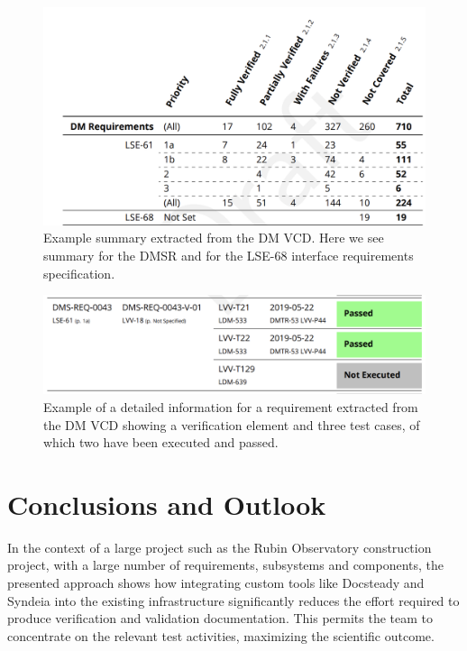 \begin{figure}
\begin{center}
\includegraphics[width=\textwidth]{imgs/VCDsumm.png}
 \caption{Example summary extracted from the DM VCD. 
 Here we see summary for the DMSR \cite{LSE-61} and for the LSE-68 interface requirements specification\cite{LSE-68}.}
 \label{fig:vcdsum}
\end{center}
\end{figure}

\begin{figure}
\begin{center}
\includegraphics[width=\textwidth]{imgs/VCDdetail.png}
 \caption{Example of a detailed information for a requirement extracted from the DM VCD 
 showing a verification element and three test cases, of which two have been executed and passed.}
 \label{fig:vcddetail}
\end{center}
\end{figure}


\section{Conclusions and Outlook}
\label{sec:conclusions}

In the context of a large project such as the Rubin Observatory construction project, with a large number of requirements,
 subsystems and components, the presented approach shows how integrating custom tools like Docsteady
and Syndeia into the existing infrastructure significantly reduces the effort
required to produce verification and validation documentation.
This permits the team to concentrate on the relevant test activities, maximizing the scientific outcome.


